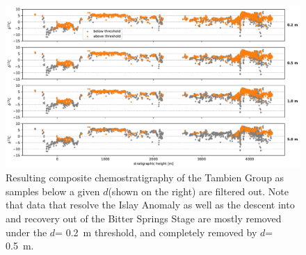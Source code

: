 \documentclass[11pt,letterpaper]{article}
\newcommand{\dsil}{$d$\xspace}
\begin{document}
\begin{figure}[h!]
\begin{center}
	\includegraphics[width=\textwidth]{Figures/Siliciclastic_Filtering_Comparison.pdf}
	\caption{Resulting composite chemostratigraphy of the Tambien Group as samples below a given \dsil (shown on the right) are filtered out. Note that data that resolve the Islay Anomaly as well as the descent into and recovery out of the Bitter Springs Stage are mostly removed under the \dsil = 0.2~m threshold, and completely removed by \dsil = 0.5~m.}
	\label{fig:Siliciclastic_Filtering_Comparison}
\end{center}
\end{figure}
\end{document}
